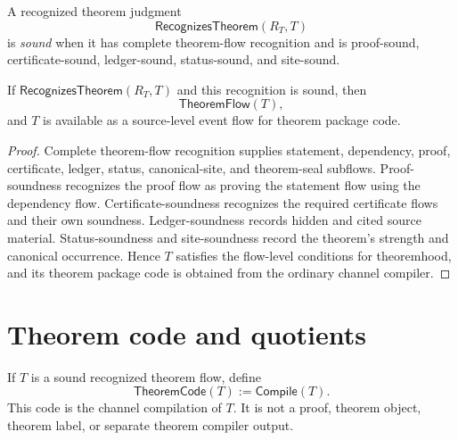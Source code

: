\begin{definition}
\label{def:theorem-generated-sound-recognized-flow}
A recognized theorem judgment
$$
  \mathsf{RecognizesTheorem}(R_T,T)
$$
is \emph{sound} when it has complete theorem-flow recognition and is proof-sound, certificate-sound, ledger-sound, status-sound, and site-sound.
\end{definition}

\begin{theorem}
\label{thm:theorem-generated-sound-establishes-theoremhood}
If $\mathsf{RecognizesTheorem}(R_T,T)$ and this recognition is sound, then
$$
  \mathsf{TheoremFlow}(T),
$$
and $T$ is available as a source-level event flow for theorem package code.
\end{theorem}

\begin{proof}
Complete theorem-flow recognition supplies statement, dependency, proof, certificate, ledger, status, canonical-site, and theorem-seal subflows. Proof-soundness recognizes the proof flow as proving the statement flow using the dependency flow. Certificate-soundness recognizes the required certificate flows and their own soundness. Ledger-soundness records hidden and cited source material. Status-soundness and site-soundness record the theorem's strength and canonical occurrence. Hence $T$ satisfies the flow-level conditions for theoremhood, and its theorem package code is obtained from the ordinary channel compiler.
\end{proof}

\section{Theorem code and quotients}
\label{sec:theorem-generated-code-and-quotients}

\begin{definition}
\label{def:theorem-generated-theorem-code}
If $T$ is a sound recognized theorem flow, define
$$
  \mathsf{TheoremCode}(T):=\mathsf{Compile}(T).
$$
This code is the channel compilation of $T$. It is not a proof, theorem object, theorem label, or separate theorem compiler output.
\end{definition}

